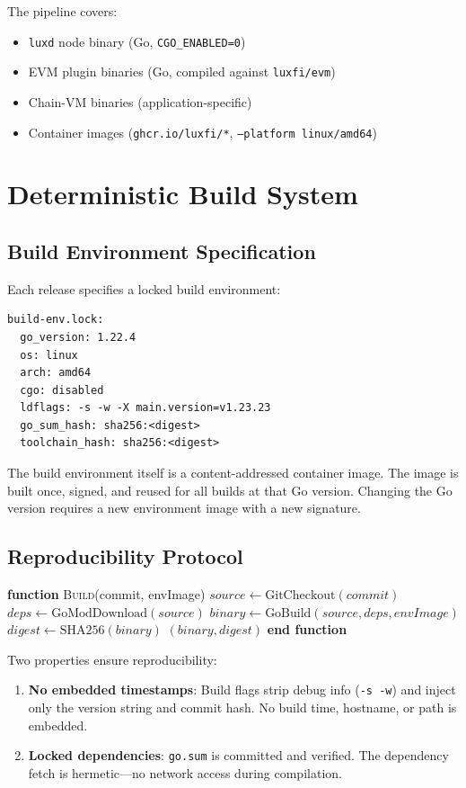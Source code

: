 \documentclass[11pt]{article}
\begin{document}
The pipeline covers:
\begin{itemize}
\item \texttt{luxd} node binary (Go, \texttt{CGO\_ENABLED=0})
\item EVM plugin binaries (Go, compiled against \texttt{luxfi/evm})
\item Chain-VM binaries (application-specific)
\item Container images (\texttt{ghcr.io/luxfi/*}, \texttt{--platform linux/amd64})
\end{itemize}

\section{Deterministic Build System}

\subsection{Build Environment Specification}

Each release specifies a locked build environment:

\begin{verbatim}
build-env.lock:
  go_version: 1.22.4
  os: linux
  arch: amd64
  cgo: disabled
  ldflags: -s -w -X main.version=v1.23.23
  go_sum_hash: sha256:<digest>
  toolchain_hash: sha256:<digest>
\end{verbatim}

The build environment itself is a content-addressed container image. The image is built once, signed, and reused for all builds at that Go version. Changing the Go version requires a new environment image with a new signature.

\subsection{Reproducibility Protocol}

\begin{algorithmic}[1]
\State \textbf{function} \textsc{Build}(commit, envImage)
\State $source \gets \text{GitCheckout}(commit)$
\State $deps \gets \text{GoModDownload}(source)$
\State $binary \gets \text{GoBuild}(source, deps, envImage)$
\State $digest \gets \text{SHA256}(binary)$
\State \Return $(binary, digest)$
\State \textbf{end function}
\end{algorithmic}

Two properties ensure reproducibility:
\begin{enumerate}
\item \textbf{No embedded timestamps}: Build flags strip debug info (\texttt{-s -w}) and inject only the version string and commit hash. No build time, hostname, or path is embedded.
\item \textbf{Locked dependencies}: \texttt{go.sum} is committed and verified. The dependency fetch is hermetic---no network access during compilation.
\end{enumerate}
\end{document}
